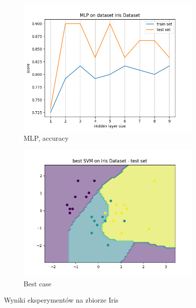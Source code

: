 \documentclass[12pt]{article}
\newcommand*{\subfigwidth}{0.24\textwidth}
\begin{document}
\begin{figure}[H]
\begin{subfigure}[t]{\subfigwidth}
        \includegraphics[width=\linewidth]{img/other_datasets/mlp/iris_accuracy.png}
        \caption{MLP, accuracy}
    \end{subfigure}
    \hfill
    \begin{subfigure}[t]{\subfigwidth}
        \includegraphics[width=\linewidth]{img/other_datasets/svm/iris_best_test.png}
        \caption{Best case}
    \end{subfigure}
    \caption{Wyniki eksperymentów na zbiorze Iris}
\end{figure}
\end{document}
